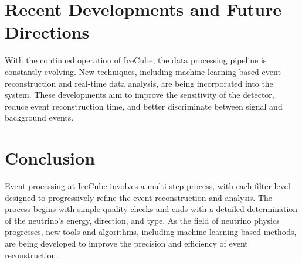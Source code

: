 \documentclass[a4paper,12pt,numbered]{article}
\begin{document}
\section{Recent Developments and Future Directions}
With the continued operation of IceCube, the data processing pipeline is constantly evolving. New techniques, including machine learning-based event reconstruction and real-time data analysis, are being incorporated into the system. These developments aim to improve the sensitivity of the detector, reduce event reconstruction time, and better discriminate between signal and background events.

\section{Conclusion}
Event processing at IceCube involves a multi-step process, with each filter level designed to progressively refine the event reconstruction and analysis. The process begins with simple quality checks and ends with a detailed determination of the neutrino's energy, direction, and type. As the field of neutrino physics progresses, new tools and algorithms, including machine learning-based methods, are being developed to improve the precision and efficiency of event reconstruction.



\end{document}
